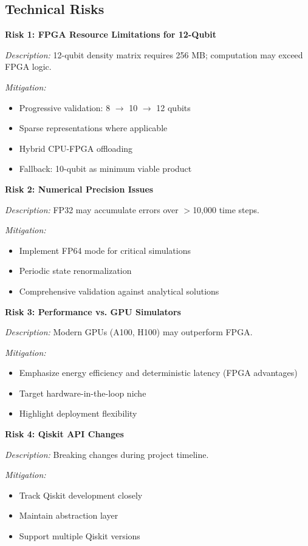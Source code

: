 \documentclass[12pt,a4paper]{article}
\begin{document}
\subsection{Technical Risks}

\textbf{Risk 1: FPGA Resource Limitations for 12-Qubit}

\textit{Description:} 12-qubit density matrix requires 256 MB; computation may exceed FPGA logic.

\textit{Mitigation:}
\begin{itemize}[noitemsep]
    \item Progressive validation: 8 $\rightarrow$ 10 $\rightarrow$ 12 qubits
    \item Sparse representations where applicable
    \item Hybrid CPU-FPGA offloading
    \item Fallback: 10-qubit as minimum viable product
\end{itemize}

\textbf{Risk 2: Numerical Precision Issues}

\textit{Description:} FP32 may accumulate errors over $>$10,000 time steps.

\textit{Mitigation:}
\begin{itemize}[noitemsep]
    \item Implement FP64 mode for critical simulations
    \item Periodic state renormalization
    \item Comprehensive validation against analytical solutions
\end{itemize}

\textbf{Risk 3: Performance vs. GPU Simulators}

\textit{Description:} Modern GPUs (A100, H100) may outperform FPGA.

\textit{Mitigation:}
\begin{itemize}[noitemsep]
    \item Emphasize energy efficiency and deterministic latency (FPGA advantages)
    \item Target hardware-in-the-loop niche
    \item Highlight deployment flexibility
\end{itemize}

\textbf{Risk 4: Qiskit API Changes}

\textit{Description:} Breaking changes during project timeline.

\textit{Mitigation:}
\begin{itemize}[noitemsep]
    \item Track Qiskit development closely
    \item Maintain abstraction layer
    \item Support multiple Qiskit versions
\end{itemize}
\end{document}
